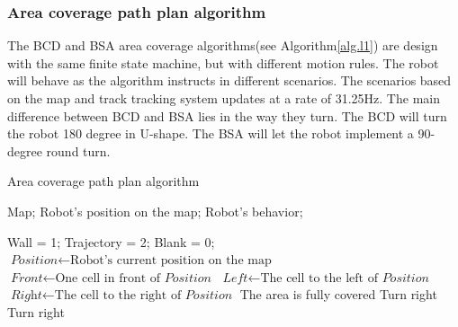 \documentclass[conference]{IEEEtran}
\begin{document}
\subsubsection{Area coverage path plan algorithm}

The BCD and BSA area coverage algorithms(see Algorithm\ref{alg.l1}) are design with the same finite state machine, but with different motion rules. The robot will behave as the algorithm instructs in different scenarios. The scenarios based on the map and track tracking system updates at a rate of 31.25Hz. The main difference between BCD and BSA lies in the way they turn. The BCD will turn the robot 180 degree in U-shape. The BSA will let the robot implement a 90-degree round turn. 


\begin{algorithm}[h]
 \caption{Area coverage path plan algorithm}
 \label{alg.l1}
 \begin{algorithmic}[1]
 \Require
 Map; Robot's position on the map;
 \Ensure
 Robot's behavior;
 
    \STATE Wall = 1;
    \STATE Trajectory = 2;
    \STATE Blank = 0;
    \STATE $\textit{Position} \gets \text{Robot's current position on the map}$
    \STATE $\textit{Front} \gets \text{One cell in front of } \textit{Position}$
    \STATE $\textit{Left} \gets \text{The cell to the left of } \textit{Position}$
    \STATE $\textit{Right} \gets \text{The cell to the right of } \textit{Position}$
    {
            {
                {The area is fully covered}
            {\ELSE}
                {Turn right}
            \ENDIF
        {
            {Turn right}}
        \ENDIF}
  \ENDIF}
  \label{code:recentEnd}
 \end{algorithmic}
\end{algorithm}
\end{document}
